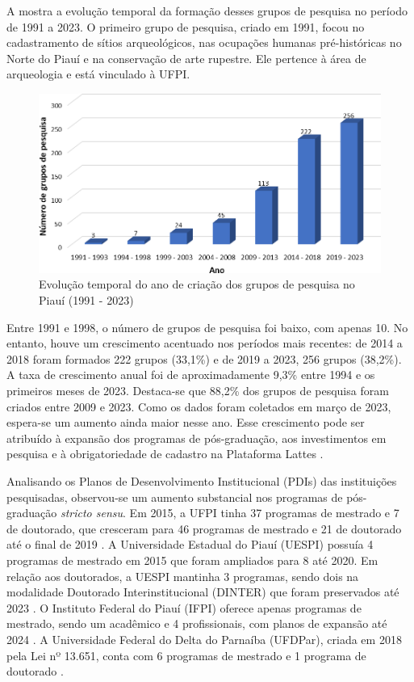 \documentclass[portuguese]{textolivre}
\begin{document}
A  mostra a evolução temporal da formação desses grupos de pesquisa no período de 1991 a 2023. O primeiro grupo de pesquisa, criado em 1991, focou no cadastramento de sítios arqueológicos, nas ocupações humanas pré-históricas no Norte do Piauí e na conservação de arte rupestre. Ele pertence à área de arqueologia e está vinculado à UFPI.

\begin{figure}
\centering
\begin{minipage}{.75\textwidth}
    \includegraphics[width=\linewidth]{Fig1.png}
    \caption{Evolução temporal do ano de criação dos grupos de pesquisa no Piauí (1991 - 2023)}
    \label{fig1}
\end{minipage}
\end{figure}

Entre 1991 e 1998, o número de grupos de pesquisa foi baixo, com apenas 10. No entanto, houve um crescimento acentuado nos períodos mais recentes: de 2014 a 2018 foram formados 222 grupos (33,1\%) e de 2019 a 2023, 256 grupos (38,2\%). A taxa de crescimento anual foi de aproximadamente 9,3\% entre 1994 e os primeiros meses de 2023. Destaca-se que 88,2\% dos grupos de pesquisa foram criados entre 2009 e 2023. Como os dados foram coletados em março de 2023, espera-se um aumento ainda maior nesse ano. Esse crescimento pode ser atribuído à expansão dos programas de pós-graduação, aos investimentos em pesquisa e à obrigatoriedade de cadastro na Plataforma Lattes \cite{costa2014,nickel2016}.

Analisando os Planos de Desenvolvimento Institucional (PDIs) das instituições pesquisadas, observou-se um aumento substancial nos programas de pós-graduação \textit{stricto sensu}. Em 2015, a UFPI tinha 37 programas de mestrado e 7 de doutorado, que cresceram para 46 programas de mestrado e 21 de doutorado até o final de 2019 \cite{ufpi2015pdi,ufpi2020pdi}. A Universidade Estadual do Piauí (UESPI) possuía 4 programas de mestrado em 2015 que foram ampliados para 8 até 2020. Em relação aos doutorados, a UESPI mantinha 3 programas, sendo dois na modalidade Doutorado Interinstitucional (DINTER) que foram preservados até 2023 \cite{uespi2017pdi,uespi2022pdi}. O Instituto Federal do Piauí (IFPI) oferece apenas programas de mestrado, sendo um acadêmico e 4 profissionais, com planos de expansão até 2024 \cite{ifpi2020}. A Universidade Federal do Delta do Parnaíba (UFDPar), criada em 2018 pela Lei nº 13.651, conta com 6 programas de mestrado e 1 programa de doutorado \cite{ufdpar2023pdi}.
\end{document}
